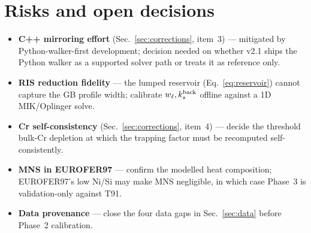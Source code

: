 \documentclass[11pt]{article}
\begin{document}
\section{Risks and open decisions}
\begin{itemize}[leftmargin=1.4em]
\item \textbf{C++ mirroring effort} (Sec.~\ref{sec:corrections}, item~3) ---
mitigated by Python-walker-first development; decision needed on whether v2.1
ships the Python walker as a supported solver path or treats it as reference
only.
\item \textbf{RIS reduction fidelity} --- the lumped reservoir
(Eq.~\eqref{eq:reservoir}) cannot capture the GB profile width; calibrate
$w_\ell,k^{\rm back}_s$ offline against a 1D MIK/Oplinger solve.
\item \textbf{Cr self-consistency} (Sec.~\ref{sec:corrections}, item~4) ---
decide the threshold bulk-Cr depletion at which the trapping factor must be
recomputed self-consistently.
\item \textbf{MNS in EUROFER97} --- confirm the modelled heat composition;
EUROFER97's low Ni/Si may make MNS negligible, in which case Phase~3 is
validation-only against T91.
\item \textbf{Data provenance} --- close the four data gaps in
Sec.~\ref{sec:data} before Phase~2 calibration.
\end{itemize}



\end{document}

